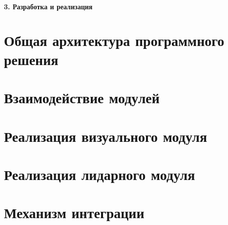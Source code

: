 \newpage
\begin{center}
  \textbf{\large 3. Разработка и реализация}
\end{center}

\section{Общая архитектура программного решения}
\section{Взаимодействие модулей}
\section{Реализация визуального модуля}
\section{Реализация лидарного модуля}
\section{Механизм интеграции}
